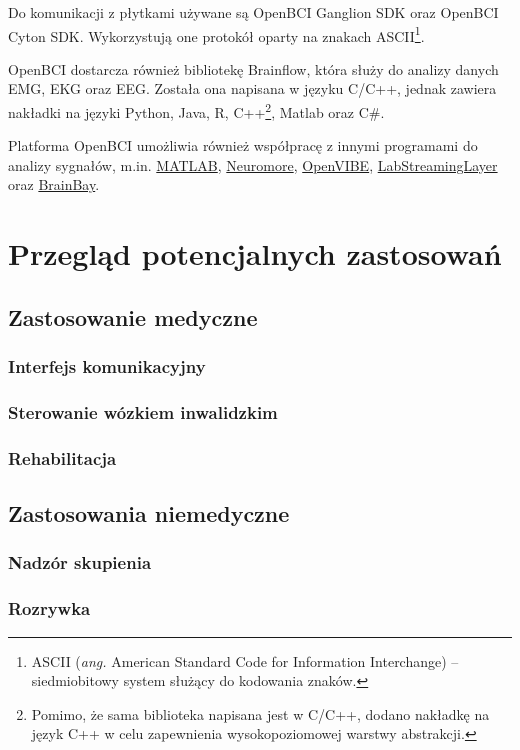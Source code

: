 \documentclass[skorowidz,skroty]{dyplomWEZUT}
\begin{document}
Do komunikacji z płytkami używane są OpenBCI Ganglion SDK oraz OpenBCI Cyton SDK. Wykorzystują one protokół oparty na znakach ASCII\footnote{ASCII (\textit{ang.} American Standard Code for Information Interchange) -- siedmiobitowy system służący do kodowania znaków.}.

OpenBCI dostarcza również bibliotekę Brainflow, która służy do analizy danych EMG, EKG oraz EEG\cite{markiv_software_brainflow}. Została ona napisana w języku C/C++, jednak zawiera nakładki na języki Python, Java, R, C++\footnote{Pomimo, że sama biblioteka napisana jest w C/C++, dodano nakładkę na język C++ w celu zapewnienia wysokopoziomowej warstwy abstrakcji.}, Matlab oraz C\#.

Platforma OpenBCI umożliwia również współpracę z innymi programami do analizy sygnałów, m.in. \href{https://www.mathworks.com/products/matlab.html}{MATLAB}, \href{https://www.neuromore.com/}{Neuromore}, \href{http://openvibe.inria.fr/}{OpenVIBE}, \href{https://github.com/sccn/labstreaminglayer}{LabStreamingLayer} oraz \href{http://www.shifz.org/brainbay/}{BrainBay}.

\section{Przegląd potencjalnych zastosowań}
\subsection{Zastosowanie medyczne}
\subsubsection{Interfejs komunikacyjny}
\subsubsection{Sterowanie wózkiem inwalidzkim}
\subsubsection{Rehabilitacja}

\subsection{Zastosowania niemedyczne}
\subsubsection{Nadzór skupienia}
\subsubsection{Rozrywka}
\end{document}
